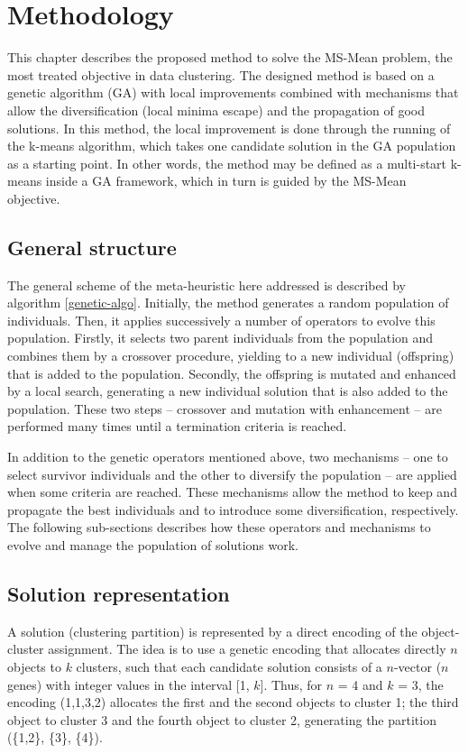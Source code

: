 \chapter{Methodology}
\label{chap:methodology}
This chapter describes the proposed method to solve the MS-Mean problem, the most treated objective in data clustering. The designed method is based on a genetic algorithm (GA) with local improvements combined with mechanisms that allow the diversification (local minima escape) and the propagation of good solutions. In this method, the local improvement is done through the running of the k-means algorithm, which takes one candidate solution in the GA population as a starting point. In other words, the method may be defined as a multi-start k-means inside a GA framework, which in turn is guided by the MS-Mean objective.

\section{General structure}
The general scheme of the meta-heuristic here addressed is described by algorithm \ref{genetic-algo}. Initially, the method generates a random population of individuals. Then, it applies successively a number of operators to evolve this population. Firstly, it selects two parent individuals from the population and combines them by a crossover procedure, yielding to a new individual (offspring) that is added to the population. Secondly, the offspring is mutated and enhanced by a local search, generating a new individual solution that is also added to the population. These two steps -- crossover and mutation with enhancement -- are performed many times until a termination criteria is reached.

In addition to the genetic operators mentioned above, two mechanisms -- one to select survivor individuals and the other to diversify the population -- are applied when some criteria are reached. These mechanisms allow the method to keep and propagate the best individuals and to introduce some diversification, respectively. The following sub-sections describes how these operators and mechanisms to evolve and manage the population of solutions work.

\section{Solution representation}
A solution (clustering partition) is represented by a direct encoding of the object-cluster assignment. The idea is to use a genetic encoding that allocates directly $n$ objects to $k$ clusters, such that each candidate solution consists of a $n$-vector ($n$ genes) with integer values in the interval [1, $k$]. Thus, for $n$ = 4 and $k$ = 3, the encoding (1,1,3,2) allocates the first and the second objects to cluster 1; the third object to cluster 3 and the fourth object to cluster 2, generating the partition (\{1,2\}, \{3\}, \{4\}).

